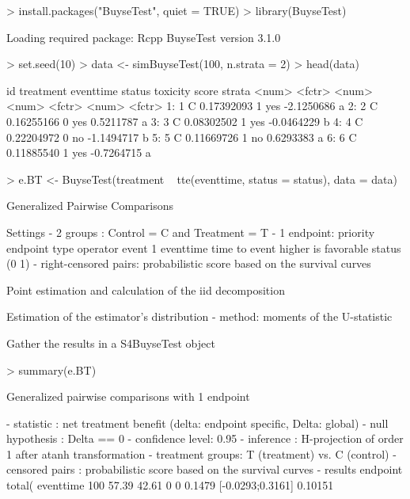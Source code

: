 \documentclass[12pt]{article}
\theoremstyle{definition}
\begin{document}
\begin{Rcode}
> install.packages("BuyseTest", quiet = TRUE)
> library(BuyseTest)
\end{Rcode}
\begin{Routput}
Loading required package: Rcpp
BuyseTest version 3.1.0
\end{Routput}

\begin{Rcode}
> set.seed(10)
> data <- simBuyseTest(100, n.strata = 2)
> head(data)
\end{Rcode}
\begin{Routput}
      id treatment  eventtime status toxicity      score strata
   <num>    <fctr>      <num>  <num>   <fctr>      <num> <fctr>
1:     1         C 0.17392093      1      yes -2.1250686      a
2:     2         C 0.16255166      0      yes  0.5211787      a
3:     3         C 0.08302502      1      yes -0.0464229      b
4:     4         C 0.22204972      0       no -1.1494717      b
5:     5         C 0.11669726      1       no  0.6293383      a
6:     6         C 0.11885540      1      yes -0.7264715      a
\end{Routput}


\begin{Rcode}
> e.BT <- BuyseTest(treatment ~ tte(eventtime, status = status), 
                    data = data)
\end{Rcode}
\begin{Routput}
         Generalized Pairwise Comparisons

Settings 
- 2 groups  : Control = C and Treatment = T
- 1 endpoint: 
priority endpoint   type           operator             event       
1        eventtime  time to event  higher is favorable  status (0 1)
- right-censored pairs: probabilistic score based on the survival curves 

Point estimation and calculation of the iid decomposition

Estimation of the estimator's distribution 
- method: moments of the U-statistic

Gather the results in a S4BuyseTest object 
\end{Routput}

\clearpage

\begin{Rcode}
> summary(e.BT)
\end{Rcode}
\begin{Routput}
	Generalized pairwise comparisons with 1 endpoint

- statistic       : net treatment benefit  (delta: endpoint specific, Delta: global) 
- null hypothesis : Delta == 0 
- confidence level: 0.95 
- inference       : H-projection of order 1 after atanh transformation 
- treatment groups: T (treatment) vs. C (control) 
- censored pairs  : probabilistic score based on the survival curves
- results
endpoint total(%
eventtime     100        57.39          42.61          0        0 0.1479  [-0.0293;0.3161] 0.10151 

\end{Routput}
\end{document}

